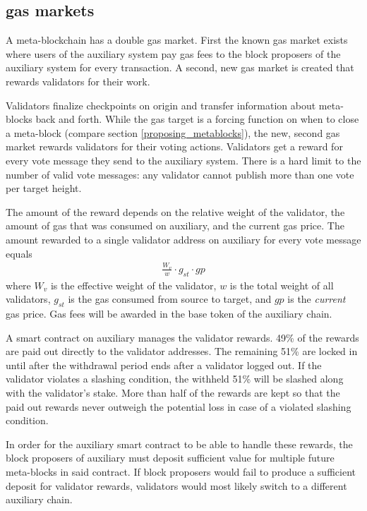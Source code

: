 \documentclass[12pt,a4paper]{article}
\begin{document}
\subsection{gas markets}

A meta-blockchain has a double gas market.
First the known gas market exists where users of the auxiliary system pay gas fees to the block proposers of the auxiliary system for every transaction.
A second, new gas market is created that rewards validators for their work.

Validators finalize checkpoints on origin and transfer information about meta-blocks back and forth.
While the gas target is a forcing function on when to close a meta-block (compare section \ref{proposing_metablocks}), the new, second gas market rewards validators for their voting actions.
Validators get a reward for every vote message they send to the auxiliary system.
There is a hard limit to the number of valid vote messages: any validator cannot publish more than one vote per target height.

The amount of the reward depends on the relative weight of the validator, the amount of gas that was consumed on auxiliary, and the current gas price.
The amount rewarded to a single validator address on auxiliary for every vote message equals
\begin{align*}
    \frac{W_v}{w} \cdot g_{st} \cdot gp
\end{align*}
where $W_v$ is the effective weight of the validator, $w$ is the total weight of all validators, $g_{st}$ is the gas consumed from source to target, and $gp$ is the \emph{current} gas price.
Gas fees will be awarded in the base token of the auxiliary chain.

A smart contract on auxiliary manages the validator rewards.
49\% of the rewards are paid out directly to the validator addresses.
The remaining 51\% are locked in until after the withdrawal period ends after a validator logged out.
If the validator violates a slashing condition, the withheld 51\% will be slashed along with the validator's stake.
More than half of the rewards are kept so that the paid out rewards never outweigh the potential loss in case of a violated slashing condition.

In order for the auxiliary smart contract to be able to handle these rewards, the block proposers of auxiliary must deposit sufficient value for multiple future meta-blocks in said contract.
If block proposers would fail to produce a sufficient deposit for validator rewards, validators would most likely switch to a different auxiliary chain.
\end{document}
